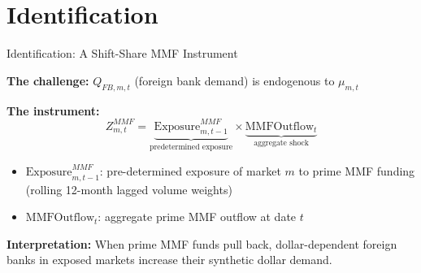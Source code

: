 \documentclass[aspectratio=169, 10pt]{beamer}
\begin{document}
\section{Identification}

\begin{frame}{Identification: A Shift-Share MMF Instrument}

  \textbf{The challenge:} $Q_{FB,m,t}$ (foreign bank demand) is endogenous to $\mu_{m,t}$

  \bigskip

  \textbf{The instrument:}
  \[
    Z_{m,t}^{MMF} = \underbrace{\text{Exposure}^{MMF}_{m,t-1}}_{\text{predetermined exposure}} \times
                   \underbrace{\text{MMFOutflow}_t}_{\text{aggregate shock}}
  \]

  \begin{itemize}
    \item $\text{Exposure}^{MMF}_{m,t-1}$: pre-determined exposure of market $m$ to prime MMF funding
          (rolling 12-month lagged volume weights)
    \item $\text{MMFOutflow}_t$: aggregate prime MMF outflow at date $t$
  \end{itemize}

  \bigskip

  \textbf{Interpretation:} When prime MMF funds pull back, dollar-dependent foreign banks
  in exposed markets increase their synthetic dollar demand.

\end{frame}
\end{document}
